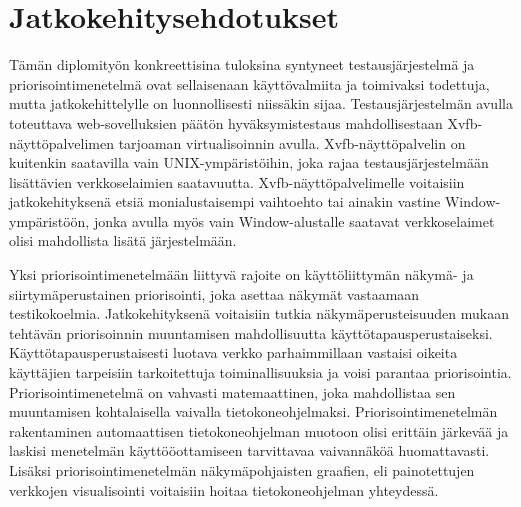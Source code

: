 \section{Jatkokehitysehdotukset} \label{ch:12_jatkokehitysehdotukset}

  Tämän diplomityön konkreettisina tuloksina syntyneet testausjärjestelmä ja priorisointimenetelmä ovat sellaisenaan käyttövalmiita ja toimivaksi todettuja, mutta jatkokehittelylle on luonnollisesti niissäkin sijaa.
  Testausjärjestelmän avulla toteuttava web-sovelluksien päätön hyväksymistestaus mahdollisestaan Xvfb-näyttöpalvelimen tarjoaman virtualisoinnin avulla.
  Xvfb-näyttöpalvelin on kuitenkin saatavilla vain UNIX-ympäristöihin, joka rajaa testausjärjestelmään lisättävien verkkoselaimien saatavuutta.
  Xvfb-näyttöpalvelimelle voitaisiin jatkokehityksenä etsiä monialustaisempi vaihtoehto tai ainakin vastine Window-ympäristöön, jonka avulla myös vain Window-alustalle saatavat verkkoselaimet olisi mahdollista lisätä järjestelmään.

  Yksi priorisointimenetelmään liittyvä rajoite on käyttöliittymän näkymä- ja siirtymäperustainen priorisointi, joka asettaa näkymät vastaamaan testikokoelmia.
  Jatkokehityksenä voitaisiin tutkia näkymäperusteisuuden mukaan tehtävän priorisoinnin muuntamisen mahdollisuutta käyttötapausperustaiseksi.
  Käyttötapausperustaisesti luotava verkko parhaimmillaan vastaisi oikeita käyttäjien tarpeisiin tarkoitettuja toiminallisuuksia ja voisi parantaa priorisointia.
  Priorisointimenetelmä on vahvasti matemaattinen, joka mahdollistaa sen muuntamisen kohtalaisella vaivalla tietokoneohjelmaksi.
  Priorisointimenetelmän rakentaminen automaattisen tietokoneohjelman muotoon olisi erittäin järkevää ja laskisi menetelmän käyttööottamiseen tarvittavaa vaivannäköä huomattavasti.
  Lisäksi priorisointimenetelmän näkymäpohjaisten graafien, eli painotettujen verkkojen visualisointi voitaisiin hoitaa tietokoneohjelman yhteydessä.

